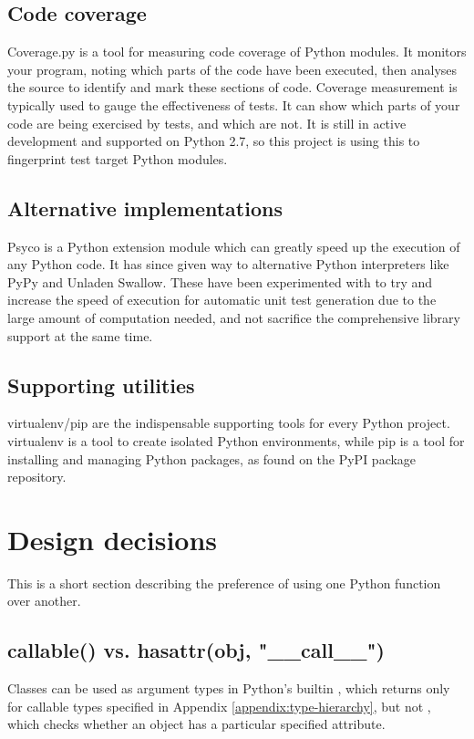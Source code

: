\documentclass{icldt}
\numberwithin{equation}{section}       %
\begin{document}
{{\subsection{Code coverage}
\textsf{Coverage.py} is a tool for measuring code coverage of Python modules. It monitors your program, noting which parts of the code have been executed, then analyses the source to identify and mark these sections of code. Coverage measurement is typically used to gauge the effectiveness of tests. It can show which parts of your code are being exercised by tests, and which are not. It is still in active development and supported on Python 2.7, so this project is using this to fingerprint test target Python modules.

\subsection{Alternative implementations}
\textsf{Psyco} is a Python extension module which can greatly speed up the execution of any Python code. It has since given way to alternative Python interpreters like \textsf{PyPy} and \textsf{Unladen Swallow}. These have been experimented with to try and increase the speed of execution for automatic unit test generation due to the large amount of computation needed, and not sacrifice the comprehensive library support at the same time.

\subsection{Supporting utilities}
\textsf{virtualenv/pip} are the indispensable supporting tools for every Python project.
\textsf{virtualenv} is a tool to create isolated Python environments, while \textsf{pip} is a tool for installing and managing Python packages, as found on the PyPI package repository.
\section{Design decisions}
This is a short section describing the preference of using one Python function over another.

\subsection{\textsf{callable()} vs. \textsf{hasattr(obj, "__call__")}}
Classes can be used as argument types in Python's builtin , which returns  only for callable types specified in Appendix \ref{appendix:type-hierarchy}, but not , which checks whether an object has a particular specified attribute.

}}
\end{document}
